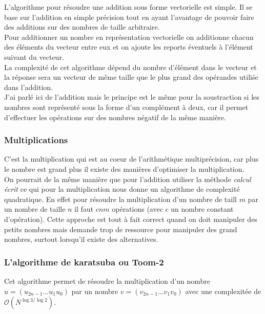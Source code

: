 \documentclass[letterpaper]{article}
\begin{document}
L'algorithme pour résoudre une addition sous forme vectorielle est simple.
Il se base sur l'addition en simple précision tout en ayant l'avantage de
pouvoir faire des additions sur des nombres de taille arbitraire. \\

Pour additionner un nombre en représentation vectorielle on additionne chacun
des éléments du vecteur entre eux et on ajoute les reports éventuels à
l'élément suivant du vecteur. \\

La complexité de cet algorithme dépend du nombre d'élément dans le vecteur et
la réponse sera un vecteur de même taille que le plus grand des opérandes
utiliśe dans l'addition.\\

J'ai parlé ici de l'addition mais le principe est le même pour la soustraction
si les nombres sont représenté sous la forme d'un complément à deux, car il
permet d'effectuer les opérations sur des nombres négatif de la même
manière\cite{wikicomplementtwo}.

\subsubsection{Multiplications}

C'est la multiplication qui est au coeur de l'arithmétique multiprécision, car
plus le nombre est grand plus il existe des manières d'optimiser la
multiplication.\\

On pourrait de la même manière que pour l'addition utiliser la méthode
\emph{calcul écrit} ce qui pour la multiplication nous donne un algorithme de
complexité quadratique. En effet pour résoudre la multiplication d'un nombre de
taill $m$ par un nombre de taille $n$ il faut $cnm$ opérations (avec $c$ un
nombre constant d'opération).  Cette approche est tout à fait correct quand on
doit manipuler des petits nombres mais demande trop de ressource pour manipuler
des grand nombres, surtout lorsqu'il existe des alternatives.

\subsubsection{L'algorithme de karatsuba ou Toom-2}

Cet algorithme permet de résoudre la multiplication d'un nombre
$u = (u_{2n-1} \dots u_1 u_0)$ par un nombre $v = (v_{2n-1} \dots v_1 v_0)$
avec une complexitée de $\mathcal{O}(N^{\log{3}/\log{2}})$.\\
\end{document}
